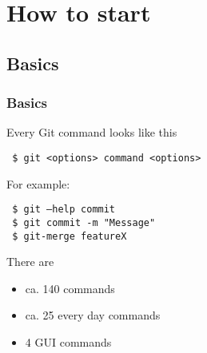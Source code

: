 \documentclass{beamer}
\begin{document}
\begin{frame}
\begin{minipage}[t]{0.48\linewidth}
{    }
  \end{minipage} 
\end{frame}


\section{How to start}
\subsection{Basics}
\begin{frame}
  \frametitle{Basics}
  Every Git command looks like this\medskip
  
  {\tt\ \$ git <options> command <options>}\medskip
  
  \pause
  For example:\medskip
  
  {\tt\ \$ git --help commit}\\
  {\tt\ \$ git commit -m "Message"}\\
  {\tt\ \$ git-merge featureX}\medskip
  
  \pause
  There are
  \begin{itemize}
    \item ca. 140 commands
    \item ca. 25 every day commands
    \item 4 GUI commands
  \end{itemize}   
\end{frame}
\end{document}
